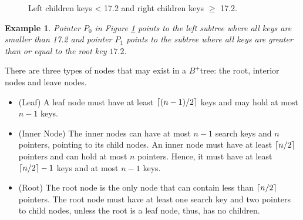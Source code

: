 \documentclass[abstracton,12pt,oneside]{scrreprt}
\DeclarePairedDelimiter\ceil{\lceil}{\rceil}
\newtheorem{example}{Example}
\begin{document}
\begin{figure}[H]
	\centering
	\vspace{2mm}
	\caption{Left children keys < 17.2 and right children keys $\geq$ 17.2.}
	\label{fig:little}
\end{figure} 
\begin{example}
	Pointer $P_0$ in Figure \ref{fig:little} points to the left subtree where all keys are smaller than 17.2 and pointer $P_1$ points to the subtree where all keys are greater than or equal to the root key $17.2$.
\end{example}

There are three types of nodes that may exist in a $B^+$tree: the root, interior nodes and leave nodes.
\begin{itemize}
	\item (Leaf) A leaf node must have at least $\ceil{(n-1)/2}$ keys and may hold at most $n-1$ keys.
	\item (Inner Node) The inner nodes can have at most $n-1$ search keys and $n$ pointers, pointing to its child nodes. An inner node must have at least $\ceil{n/2}$ pointers and can hold at most $n$ pointers. Hence, it must have at least $\ceil{n/2}-1$ keys and at most $n-1$ keys.
	\item (Root) The root node is the only node that can contain less than $\ceil{n/2}$ pointers. The root node must have at least one search key and two pointers to child nodes, unless the root is a leaf node, thus, has no children.
\end{itemize}
\end{document}
